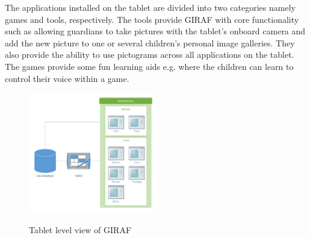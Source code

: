 The applications installed on the tablet are divided into two categories namely games and tools, respectively. The tools provide GIRAF with core functionality such as allowing guardians to take pictures with the tablet's onboard camera and add the new picture to one or several children's personal image galleries. They also provide the ability to use pictograms across all applications on the tablet. The games provide some fun learning aids e.g. where the children can learn to control their voice within a game. 

\begin{figure}[htpb]
\begin{center}
\includegraphics[width=0.5\textwidth]{img/tablet_level.pdf}
\label{fig:tablet_level}
\caption{Tablet level view of GIRAF}
\end{center}
\end{figure}
